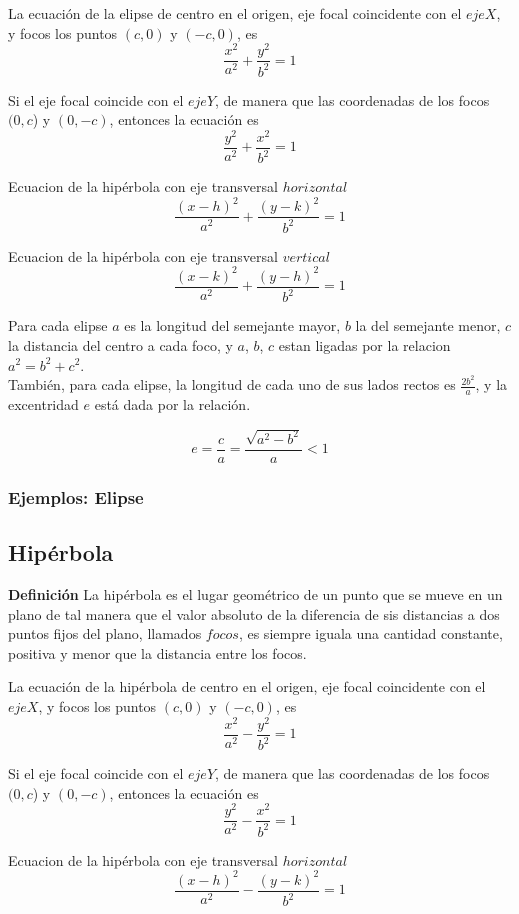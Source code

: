 \documentclass[12pt,a4paper,draft]{article}
\begin{document}
La ecuación de la elipse de centro en el origen, eje focal coincidente con el $eje X$, y focos los puntos $(c,0)$ y $(-c,0)$, es
$$ {\frac{x^2}{a^2} + \frac{y^2}{b^2} = 1} $$

Si el eje focal coincide con el $eje Y$, de manera que las coordenadas de los focos $(0,c$) y $(0,-c)$, entonces la ecuación es 
$$ {\frac{y^2}{a^2} + \frac{x^2}{b^2} = 1} $$

Ecuacion de la hipérbola con eje transversal $horizontal$
$$ {\frac{(x - h)^2}{a^2} + \frac{(y - k)^2}{b^2} = 1} $$

Ecuacion de la hipérbola con eje transversal $vertical$
$$ {\frac{(x - k)^2}{a^2} + \frac{(y - h)^2}{b^2} = 1} $$

Para cada elipse $a$ es la longitud del semejante mayor, $b$ la del semejante menor, $c$ la distancia del centro a cada foco, y $a$, $b$, $c$ estan ligadas por la relacion $a^2 = b^2 + c^2$.
\\También, para cada elipse, la longitud de cada uno de sus lados rectos es $\frac{2b^2}{a}$, y la excentridad $e$ está dada por la relación.

$$e = \frac{c}{a} = \frac{\sqrt{a^2 - b^2}}{a} < 1$$

\subsubsection{Ejemplos: Elipse}

\subsection{Hipérbola}
\textbf{Definición} La hipérbola es el lugar geométrico de un punto que se mueve en un plano de tal manera que el valor absoluto de la diferencia de sis distancias a dos puntos fijos del plano, llamados $focos$, es siempre iguala una cantidad constante, positiva y menor que la distancia entre los focos.

La ecuación de la hipérbola de centro en el origen, eje focal coincidente con el $eje X$, y focos los puntos $(c,0)$ y $(-c,0)$, es
$$ {\frac{x^2}{a^2} - \frac{y^2}{b^2} = 1} $$

Si el eje focal coincide con el $eje Y$, de manera que las coordenadas de los focos $(0,c$) y $(0,-c)$, entonces la ecuación es 
$$ {\frac{y^2}{a^2} - \frac{x^2}{b^2} = 1} $$

Ecuacion de la hipérbola con eje transversal $horizontal$
$$ {\frac{(x - h)^2}{a^2} - \frac{(y - k)^2}{b^2} = 1} $$
\end{document}
